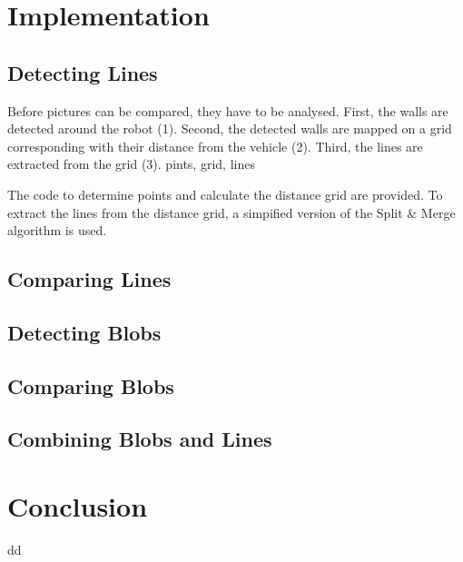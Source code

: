 \documentclass[12pt]{article}
\begin{document}
\clearpage

\section{Implementation}
\subsection{Detecting Lines}
Before pictures can be compared, they have to be analysed. First, the walls are detected around the robot (1). Second, the detected walls are mapped on a grid corresponding with their distance from the vehicle (2). Third, the lines are extracted from the grid (3).
pints, grid, lines

The code to determine points and calculate the distance grid are provided. To extract the lines from the distance grid, a simpified version of the Split \& Merge algorithm is used. 
 
\subsection{Comparing Lines}
\subsection{Detecting Blobs}
\subsection{Comparing Blobs}
\subsection{Combining Blobs and Lines}
\section{Conclusion}
dd
\end{document}
